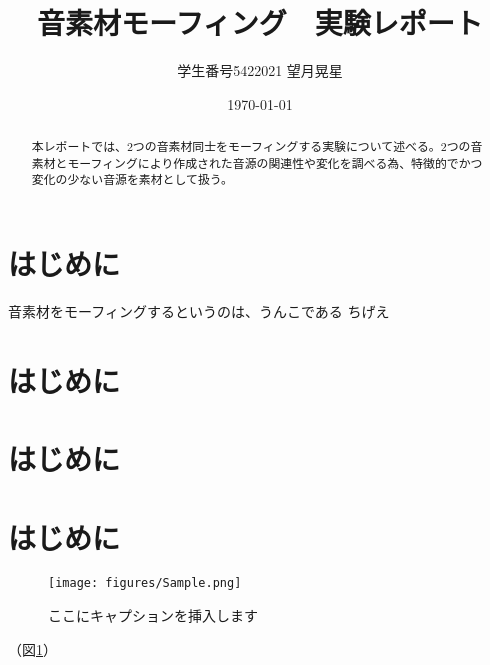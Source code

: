 \documentclass[platex,dvipdfmx]{jlreq}			%
\title{音素材モーフィング　実験レポート}
\author{学生番号5422021 望月晃星}
\date{\today}
\begin{document}
\maketitle

\begin{abstract}%
本レポートでは、2つの音素材同士をモーフィングする実験について述べる。2つの音素材とモーフィングにより作成された音源の関連性や変化を調べる為、特徴的でかつ変化の少ない音源を素材として扱う。
\end{abstract}

\section{はじめに}
音素材をモーフィングするというのは、うんこである ちげえ

\section{はじめに}
\section{はじめに}
\section{はじめに}

\begin{figure}
\centering
\texttt{[image: figures/Sample.png]}
\caption{ここにキャプションを挿入します}
\label{fig:model}
\end{figure}

（図\ref{fig:model}）
\end{document}
